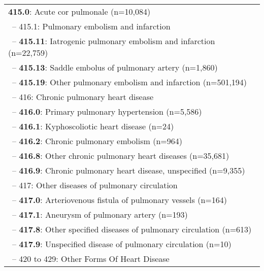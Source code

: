 \begin{longtable}{p{\textwidth}}
{\color{ForestGreen} \textbf{415.0}}: Acute cor pulmonale (n=10,084)} \\ \-\ \hspace{30pt}\footnotesize{-- 415.1: Pulmonary embolism and infarction} \\ \-\ \hspace{40pt}\footnotesize{-- {\color{ForestGreen} \textbf{415.11}}: Iatrogenic pulmonary embolism and infarction (n=22,759)} \\ \-\ \hspace{40pt}\footnotesize{-- {\color{ForestGreen} \textbf{415.13}}: Saddle embolus of pulmonary artery (n=1,860)} \\ \-\ \hspace{40pt}\footnotesize{-- {\color{ForestGreen} \textbf{415.19}}: Other pulmonary embolism and infarction (n=501,194)} \\ \-\ \hspace{20pt}\footnotesize{-- 416: Chronic pulmonary heart disease} \\ \-\ \hspace{30pt}\footnotesize{-- {\color{ForestGreen} \textbf{416.0}}: Primary pulmonary hypertension (n=5,586)} \\ \-\ \hspace{30pt}\footnotesize{-- {\color{ForestGreen} \textbf{416.1}}: Kyphoscoliotic heart disease (n=24)} \\ \-\ \hspace{30pt}\footnotesize{-- {\color{ForestGreen} \textbf{416.2}}: Chronic pulmonary embolism (n=964)} \\ \-\ \hspace{30pt}\footnotesize{-- {\color{ForestGreen} \textbf{416.8}}: Other chronic pulmonary heart diseases (n=35,681)} \\ \-\ \hspace{30pt}\footnotesize{-- {\color{ForestGreen} \textbf{416.9}}: Chronic pulmonary heart disease, unspecified (n=9,355)} \\ \-\ \hspace{20pt}\footnotesize{-- 417: Other diseases of pulmonary circulation} \\ \-\ \hspace{30pt}\footnotesize{-- {\color{ForestGreen} \textbf{417.0}}: Arteriovenous fistula of pulmonary vessels (n=164)} \\ \-\ \hspace{30pt}\footnotesize{-- {\color{ForestGreen} \textbf{417.1}}: Aneurysm of pulmonary artery (n=193)} \\ \-\ \hspace{30pt}\footnotesize{-- {\color{ForestGreen} \textbf{417.8}}: Other specified diseases of pulmonary circulation (n=613)} \\ \-\ \hspace{30pt}\footnotesize{-- {\color{ForestGreen} \textbf{417.9}}: Unspecified disease of pulmonary circulation (n=10)} \\ \-\ \hspace{10pt}\footnotesize{-- 420 to 429: Other Forms Of Heart Disease} 
\end{longtable}
